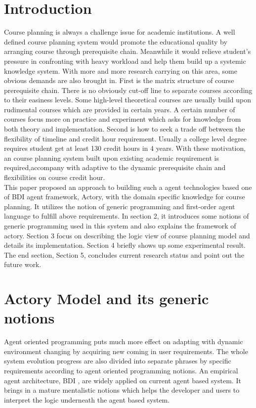 \documentclass{sig-alternate}
\begin{document}
\section{Introduction}
Course planning is always a challenge issue for academic institutions.  A well defined course planning system would promote the educational quality by arranging course through prerequisite chain. Meanwhile it would relieve student's pressure in confronting with heavy workload and help them build up a systemic knowledge system.  With more and more research carrying on this area, some obvious demands are also brought in. First is the matrix structure of course prerequisite chain.  There is no obviously cut-off line to separate courses according to their easiness levels.  Some high-level theoretical courses are usually build upon rudimental courses which are provided in certain years. A certain number of courses focus more on practice and experiment which asks for  knowledge from both theory and implementation.  Second is how to seek a trade off between the flexibility of timeline and credit hour requirement.  Usually a college level degree requires student get at least 130 credit hours in 4 years.  With these motivation, an course planning system built upon existing academic requirement is required,accompany with adaptive to the dynamic prerequisite chain and flexibilities on course credit hour. \\

This paper proposed an approach to building such a agent technologies based one of BDI agent framework, Actory,  with the domain specific knowledge for course planning.   It utilizes the notion of generic programming and first-order agent language to fulfill above requirements. In section 2,  it introduces some notions of generic programming used in this system and also explains the framework of actory. Section 3 focus on describing the logic view of course planning model and details its implementation. Section 4 briefly shows up some experimental result.  The end section, Section 5, concludes current research status and point out the future work. \\

\section{Actory Model and its generic notions}
Agent oriented programming puts much more effect on adapting with dynamic environment changing by acquiring new coming in user requirements\cite{bresciani04}.   The whole system evolution progress  are also divided into separate phrases by specific requirements  according to agent oriented programming notions.  An empirical agent architecture, BDI\cite{rao1991mra} , are widely applied on current agent based system.  It brings in a mature mentalistic notions which helps the developer and users to interpret the logic underneath the agent based system.\\
\end{document}
